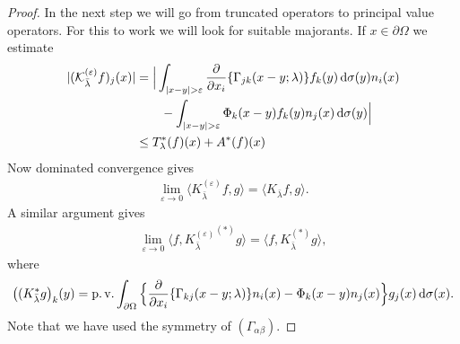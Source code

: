 \begin{proof}
  In the next step we will go from truncated operators to principal value operators. 
  For this to work we will look for suitable majorants.
  If $x \in \partial\Omega$ we estimate
  \begin{align*}
    |(\mathcal{K}_{\bar\lambda}^{(\varepsilon)}f)_j (x)|
    &= \Big| \int_{|x - y| > \varepsilon} \frac{\partial}{\partial x_i} \{ \Gamma_{jk}(x - y; \lambda) \} f_k(y) \, {\operatorname{d}\!{\sigma}}(y) n_i(x)  \\
    &\qquad - \int_{|x - y| > \varepsilon} \Phi_k(x - y) f_k(y) n_j(x) \, {\operatorname{d}\!{\sigma}}(y) \Big| \\
    &\leq T_\lambda^*(f)(x) + A^*(f)(x)
  \end{align*}
  Now dominated convergence gives
  \begin{align*}
    \lim_{\varepsilon \to 0} \langle K_{\bar\lambda}^{(\varepsilon)} f, g \rangle = \langle K_{\bar\lambda} f, g\rangle.
  \end{align*}
  A similar argument gives
  \begin{align*}
    \lim_{\varepsilon \to 0} \langle f, {K_{\bar\lambda}^{(\varepsilon)}}^{(*)} g \rangle = \langle f,K_{\bar\lambda}^{(*)}  g\rangle,
  \end{align*}
  where
  \begin{align*}
    \big( ( K_{\bar\lambda}^* g\big)_k(y)
    = \operatorname{p. v.}\int_{\partial\Omega} \Big\{ \frac{\partial}{\partial x_i} \{ \Gamma_{kj}(x - y; \lambda)\} n_i(x) - \Phi_k(x - y) n_j(x) \Big\} g_j(x) \, {\operatorname{d}\!{\sigma}}(x). 
  \end{align*}
  Note that we have used the symmetry of $(\Gamma_{\alpha\beta})$.


\end{proof}
